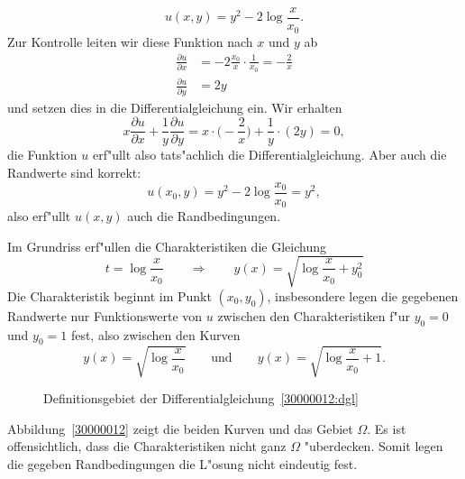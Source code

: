 \begin{loesung}
\begin{teilaufgaben}
\[
u(x,y) = y^2 - 2\log\frac{x}{x_0}.
\]
Zur Kontrolle leiten wir diese Funktion nach $x$ und $y$ ab
\begin{align*}
\frac{\partial u}{\partial x}
&=
-2\frac{x_0}{x}\cdot\frac1{x_0}=-\frac2x
\\
\frac{\partial u}{\partial y}
&=
2y
\end{align*}
und setzen dies in die Differentialgleichung ein.
Wir erhalten
\[
x\frac{\partial u}{\partial x} + \frac1y\frac{\partial u}{\partial y}
=
x\cdot \biggl(-\frac{2}{x}\biggr)
+ \frac1y\cdot (2y)
=
0,
\]
die Funktion $u$ erf"ullt also tats"achlich die Differentialgleichung.
Aber auch die Randwerte sind korrekt:
\[
u(x_0,y)=y^2-2\log\frac{x_0}{x_0}=y^2,
\]
also erf"ullt $u(x,y)$ auch die Randbedingungen.
\item
Im Grundriss erf"ullen die Charakteristiken die Gleichung
\[
t = \log\frac{x}{x_0}
\qquad\Rightarrow\qquad
y(x)=\sqrt{\log\frac{x}{x_0}+y_0^2}
\]
Die Charakteristik beginnt im Punkt $(x_0,y_0)$, insbesondere legen die
gegebenen Randwerte nur Funktionswerte von $u$ zwischen den Charakteristiken
f"ur $y_0=0$ und $y_0=1$ fest, also zwischen den Kurven
\[
y(x) = \sqrt{\log\frac{x}{x_0}}
\qquad\text{und}\qquad
y(x) = \sqrt{\log\frac{x}{x_0}+1}.
\]
\begin{figure}
\centering
{}
\caption{Definitionsgebiet der Differentialgleichung~\ref{30000012:dgl}
\label{30000012:domain}}
\end{figure}
Abbildung~\ref{30000012} zeigt die beiden Kurven und das Gebiet $\Omega$.
Es ist offensichtlich, dass die Charakteristiken nicht ganz $\Omega$
"uberdecken.
Somit legen die gegeben Randbedingungen die L"osung nicht eindeutig fest.
\qedhere
\end{teilaufgaben}
\end{loesung}
